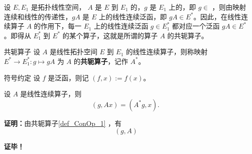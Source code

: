 

设 $E,E_1$ 是拓扑线性空间， $A$ 是 $E$ 到 $E_1$ 的，$g$ 是 $E_1$ 上的，即 $g\in$ ，则由映射连续和线性的传递性，$gA$ 是 $E$ 上的线性连续泛函，即 $gA\in E^*$。因此，在线性连续算子 $A$ 的作用下，每一 $E_1$ 上的线性连续泛函 $g\in E_1^*$ 都对应一个泛函 $gA\in E^*$。即得从 $E_1^*$ 到 $E^*$ 的某个算子，这就是所谓的算子 $A$ 的共轭算子。

\begin{definition}{共轭算子}\label{def_ConOp_1}
设 $A$ 是线性拓扑空间 $E$ 到 $E_1$ 的线性连续算子，则称映射 $E^*\rightarrow  E_1^*:g\mapsto gA$ 为 $A$ 的\textbf{共轭算子}，记作 $A^*$。
\end{definition}

\begin{definition}{符号约定}
设 $f$ 是泛函，则记 $(f,x):=f(x)$。
\end{definition}

\begin{theorem}{}
设 $A$ 是线性连续算子，则
\begin{equation}
(g,Ax)=(A^* g,x).~
\end{equation}
\end{theorem}

\textbf{证明：}由共轭算子\autoref{def_ConOp_1} ，有
\begin{equation}
(g,A)
\end{equation}




\textbf{证毕！}
 


